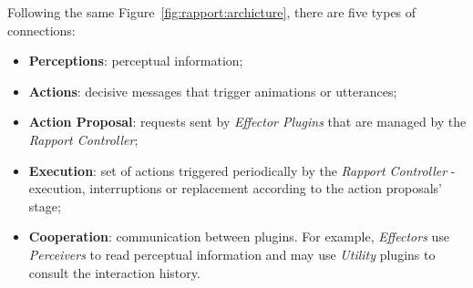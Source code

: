 Following the same Figure~\ref{fig:rapport:archicture}, there are five types of connections:
\begin{itemize}
	\item \textbf{Perceptions}: perceptual information;
	\item \textbf{Actions}: decisive messages that trigger animations or utterances;
	\item \textbf{Action Proposal}: requests sent by \textit{Effector Plugins} that are managed by the \textit{Rapport Controller};
	\item \textbf{Execution}: set of actions triggered periodically by the \textit{Rapport Controller} - execution, interruptions or replacement according to the action proposals' stage;
	\item \textbf{Cooperation}: communication between plugins. For example, \textit{Effectors} use \textit{Perceivers} to read perceptual information and may use \textit{Utility} plugins to consult the interaction history.
\end{itemize}




